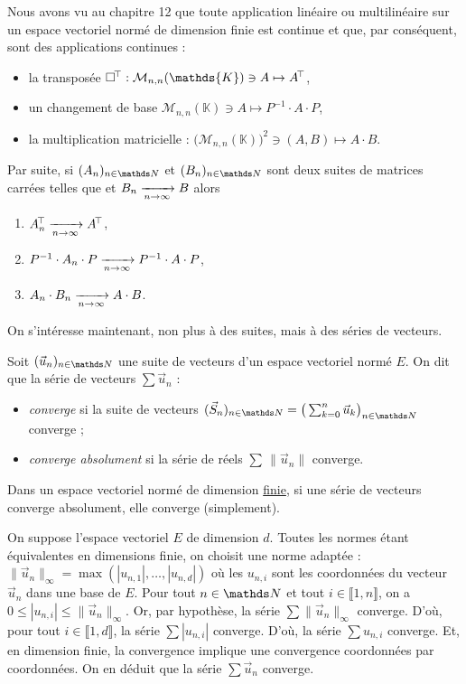 Nous avons vu au chapitre 12 que toute application linéaire ou multilinéaire sur un espace vectoriel normé de dimension finie est continue et que, par conséquent, sont des applications continues :
\begin{itemize}
	\item la transposée $\square^\T : \mathcal{M}_{n,n}(\mathds{K}) \ni A \mapsto A^\T$,
	\item un changement de base $\mathcal{M}_{n,n}(\mathds{K}) \ni A \mapsto P^{-1}\cdot A\cdot P$,
	\item la multiplication matricielle : $\big(\mathcal{M}_{n,n}(\mathds{K})\big)^2 \ni (A,B) \mapsto A\cdot B$.
\end{itemize}
Par suite, si $(A_n)_{n\in\N}$ et $(B_n)_{n\in\N}$\/ sont deux suites de matrices carrées telles que  et $B_n \xrightarrow[n\to \infty]{} B$ alors
\begin{enumerate}[label=(\arabic*)]
	\item $A_n^{\!\!\,\top} \xrightarrow[n\to \infty]{} A^{\!\!\,\top}$,
	\item $P^{-1} \cdot A_n \cdot P \xrightarrow[n\to \infty]{} P^{-1}\cdot A\cdot P$,
	\item $A_n \cdot B_n \xrightarrow[n\to \infty]{} A \cdot B$.
\end{enumerate}
On s'intéresse maintenant, non plus à des suites, mais à des séries de vecteurs.

\begin{defn}
	Soit $(\vec{u}_n)_{n\in\N}$\/ une suite de vecteurs d'un espace vectoriel normé $E$. On dit que la série de vecteurs $\sum \vec{u}_n$\/ :
	\begin{itemize}
		\item \textit{converge} si la suite de vecteurs $(\vec{S}_n)_{n\in \N} = \big(\sum_{k=0}^n \vec{u}_k\big)_{n \in \N}$ converge ;
		\item \textit{converge absolument} si la série de réels $\sum\,\|\vec{u}_n\|$ converge.
	\end{itemize}
\end{defn}

\begin{prop}
	Dans un espace vectoriel normé de dimension \ul{finie}, si une série de vecteurs converge absolument, elle converge (simplement).
\end{prop}

\begin{prv}
	On suppose l'espace vectoriel $E$ de dimension $d$. Toutes les normes étant équivalentes en dimensions finie, on choisit une norme adaptée : $\|\vec{u}_n\|_\infty = \max(|u_{n,1}|, \ldots, |u_{n,d}|)$ où les $u_{n,i}$ sont les coordonnées du vecteur $\vec{u}_n$ dans une base de $E$.
	Pour tout $n \in \N$ et tout $i \in \llbracket 1,n \rrbracket$, on a $0 \le |u_{n,i}| \le \|\vec{u}_n\|_\infty$.
	Or, par hypothèse, la série $\sum \|\vec{u}_n\|_\infty$\/ converge. D'où, pour tout $i \in \llbracket 1,d \rrbracket$, la série $\sum |u_{n,i}|$ converge.
	D'où, la série $\sum u_{n,i}$ converge.
	Et, en dimension finie, la convergence implique une convergence coordonnées par coordonnées.
	On en déduit que la série $\sum \vec{u}_n$ converge.
\end{prv}

